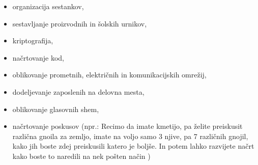 \begin{itemize}
    \item organizacija sestankov,
    \item sestavljanje proizvodnih in šolskih urnikov,
    \item kriptografija,
    \item načrtovanje kod,
    \item oblikovanje prometnih, električnih in komunikacijskih omrežij,
    \item dodeljevanje zaposlenih na delovna mesta,
    \item oblikovanje glasovnih shem,
    \item načrtovanje poskusov (npr.: Recimo da imate kmetijo, pa želite preiskusit različna gnoila za zemljo, imate na voljo samo 3 njive, pa 7 različnih gnojil, kako jih boste zdej preiskusili katero je boljše. In potem lahko razvijete načrt kako boste to naredili na nek pošten način )
\end{itemize}
\begin{center}
\end{center}
